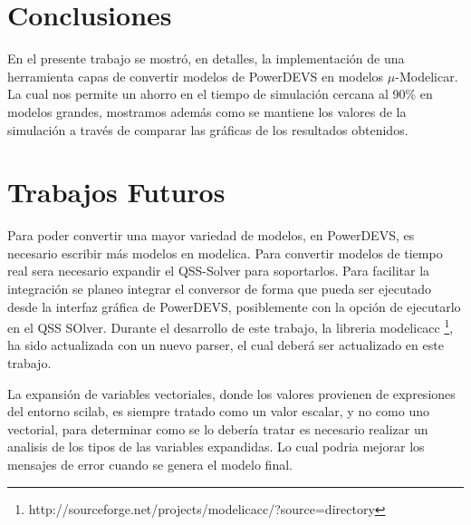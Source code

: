 
\section{Conclusiones}

	En el presente trabajo se mostró, en detalles, la implementación de una herramienta capas de convertir modelos de PowerDEVS en modelos $\mu$-Modelicar.  La cual nos permite un ahorro 
	en el tiempo de simulación cercana al 90\% en modelos grandes, mostramos además como se mantiene los valores de la simulación a través de comparar las gráficas de 
	los resultados obtenidos.

\section{Trabajos Futuros}
	Para poder convertir una mayor variedad de modelos, en PowerDEVS, es necesario escribir más modelos en modelica.
	Para convertir modelos de tiempo real sera necesario expandir el QSS-Solver para soportarlos.
	Para facilitar la integración se planeo integrar el conversor de forma que pueda ser ejecutado desde la interfaz gráfica de PowerDEVS, posiblemente con la opción de ejecutarlo en el 
	QSS SOlver.
	Durante el desarrollo de este trabajo, la libreria modelicacc \footnote{http://sourceforge.net/projects/modelicacc/?source=directory}, ha sido actualizada con un nuevo parser, 
	el cual deberá ser actualizado en este trabajo.

	La expansión de variables vectoriales, donde los valores provienen de expresiones del entorno scilab, es siempre tratado como un valor escalar, y no como uno vectorial, 
	para determinar como se lo debería tratar es necesario realizar un analisis de los tipos de las variables expandidas. 
	Lo cual podria mejorar los mensajes de error cuando se genera el modelo final.
